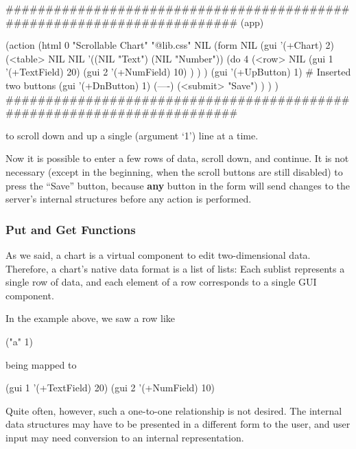 \begin{wideverbatim}
########################################################################
(app)

(action
   (html 0 "Scrollable Chart" "@lib.css" NIL
      (form NIL
         (gui '(+Chart) 2)
         (<table> NIL NIL '((NIL "Text") (NIL "Number"))
            (do 4
               (<row> NIL
                  (gui 1 '(+TextField) 20)
                  (gui 2 '(+NumField) 10) ) ) )
         (gui '(+UpButton) 1)                   # Inserted two buttons
         (gui '(+DnButton) 1)
         (----)
         (<submit> "Save") ) ) )
########################################################################
\end{wideverbatim}

to scroll down and up a single (argument `1') line at a time.

Now it is possible to enter a few rows of data, scroll down, and
continue. It is not necessary (except in the beginning, when the scroll
buttons are still disabled) to press the ``Save'' button, because \textbf{any}
button in the form will send changes to the server's internal structures
before any action is performed.

\subsubsection{ Put and Get Functions}
\label{sec:appl-devel-put-and-get-functions}%

As we said, a chart is a virtual component to edit two-dimensional data.
Therefore, a chart's native data format is a list of lists: Each sublist
represents a single row of data, and each element of a row corresponds
to a single GUI component.

In the example above, we saw a row like


\begin{wideverbatim}
("a" 1)
\end{wideverbatim}

being mapped to


\begin{wideverbatim}
(gui 1 '(+TextField) 20)
(gui 2 '(+NumField) 10)
\end{wideverbatim}

Quite often, however, such a one-to-one relationship is not desired. The
internal data structures may have to be presented in a different form to
the user, and user input may need conversion to an internal
representation.

